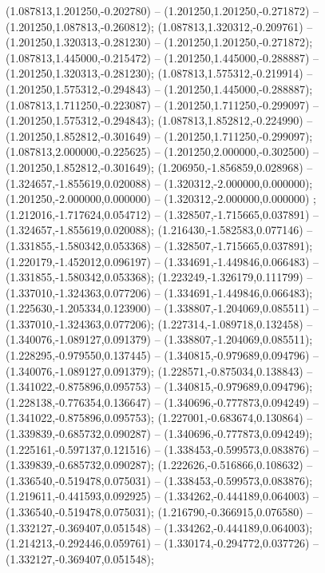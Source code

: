  (1.087813,1.201250,-0.202780) -- (1.201250,1.201250,-0.271872) -- (1.201250,1.087813,-0.260812);
 (1.087813,1.320312,-0.209761) -- (1.201250,1.320313,-0.281230) -- (1.201250,1.201250,-0.271872);
 (1.087813,1.445000,-0.215472) -- (1.201250,1.445000,-0.288887) -- (1.201250,1.320313,-0.281230);
 (1.087813,1.575312,-0.219914) -- (1.201250,1.575312,-0.294843) -- (1.201250,1.445000,-0.288887);
 (1.087813,1.711250,-0.223087) -- (1.201250,1.711250,-0.299097) -- (1.201250,1.575312,-0.294843);
 (1.087813,1.852812,-0.224990) -- (1.201250,1.852812,-0.301649) -- (1.201250,1.711250,-0.299097);
 (1.087813,2.000000,-0.225625) -- (1.201250,2.000000,-0.302500) -- (1.201250,1.852812,-0.301649);
 (1.206950,-1.856859,0.028968) -- (1.324657,-1.855619,0.020088) -- (1.320312,-2.000000,0.000000);
 (1.201250,-2.000000,0.000000) -- (1.320312,-2.000000,0.000000) ;
 (1.212016,-1.717624,0.054712) -- (1.328507,-1.715665,0.037891) -- (1.324657,-1.855619,0.020088);
 (1.216430,-1.582583,0.077146) -- (1.331855,-1.580342,0.053368) -- (1.328507,-1.715665,0.037891);
 (1.220179,-1.452012,0.096197) -- (1.334691,-1.449846,0.066483) -- (1.331855,-1.580342,0.053368);
 (1.223249,-1.326179,0.111799) -- (1.337010,-1.324363,0.077206) -- (1.334691,-1.449846,0.066483);
 (1.225630,-1.205334,0.123900) -- (1.338807,-1.204069,0.085511) -- (1.337010,-1.324363,0.077206);
 (1.227314,-1.089718,0.132458) -- (1.340076,-1.089127,0.091379) -- (1.338807,-1.204069,0.085511);
 (1.228295,-0.979550,0.137445) -- (1.340815,-0.979689,0.094796) -- (1.340076,-1.089127,0.091379);
 (1.228571,-0.875034,0.138843) -- (1.341022,-0.875896,0.095753) -- (1.340815,-0.979689,0.094796);
 (1.228138,-0.776354,0.136647) -- (1.340696,-0.777873,0.094249) -- (1.341022,-0.875896,0.095753);
 (1.227001,-0.683674,0.130864) -- (1.339839,-0.685732,0.090287) -- (1.340696,-0.777873,0.094249);
 (1.225161,-0.597137,0.121516) -- (1.338453,-0.599573,0.083876) -- (1.339839,-0.685732,0.090287);
 (1.222626,-0.516866,0.108632) -- (1.336540,-0.519478,0.075031) -- (1.338453,-0.599573,0.083876);
 (1.219611,-0.441593,0.092925) -- (1.334262,-0.444189,0.064003) -- (1.336540,-0.519478,0.075031);
 (1.216790,-0.366915,0.076580) -- (1.332127,-0.369407,0.051548) -- (1.334262,-0.444189,0.064003);
 (1.214213,-0.292446,0.059761) -- (1.330174,-0.294772,0.037726) -- (1.332127,-0.369407,0.051548);
